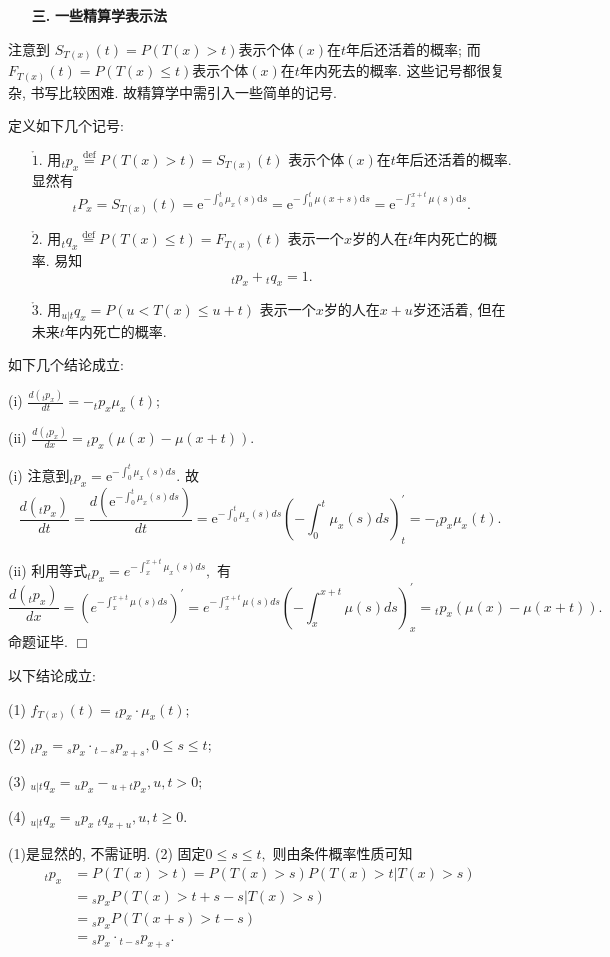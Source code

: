 \documentclass[a4paper,10pt]{ctexbook}
\newcommand{\hei}{\CJKfamily{hei}}      %
\def\qed{\hfill$\Box$\medskip}
\begin{document}
\begin{itemize}
    \item[{\bf\hei 三.}]{\bf\hei 一些精算学表示法}
\end{itemize}
注意到 $ S_{T(x)}(t)=P(T(x)>t)$表示个体$ (x)$在$t$年后还活着的概率; 而$F_{T(x)}(t)=P(T(x)\le t)$表示个体$(x)$在$t$年内死去的概率. 这些记号都很复杂, 书写比较困难. 故精算学中需引入一些简单的记号.


定义如下几个记号:
\begin{enumerate}
    \item[$\mathring 1.$] 用$_tp_{x}\stackrel{\text{def}}{=}P(T(x)>t)=S_{T(x)}(t)$
        表示个体$(x)$在$t$年后还活着的概率. 显然有
        $$ {}_tP_x=S_{T(x)}(t)=\mathrm{e}^{-\int_{0}^{t}\mu_x(s)\mathrm{d}s}=\mathrm{e}^{-\int_{0}^{t}\mu(x+s)\mathrm{d}s}=\mathrm{e}^{-\int_{x}^{x+t}\mu(s)\mathrm{d}s}.$$
    \item[$\mathring 2.$] 用$_tq_{x}\stackrel{\text{def}}{=}P(T(x)\leq t)=F_{T(x)}(t)$
        表示一个$x$岁的人在$t$年内死亡的概率. 易知
        $$_tp_{x}+{}_tq_{x}=1.$$
    \item[$\mathring 3.$] 用$ _{u|t}q_x=P(u<T(x)\leq u+t)$
        表示一个$x$岁的人在$x+u$岁还活着, 但在未来$t$年内死亡的概率.
\end{enumerate}
\begin{proposition}如下几个结论成立:

    (i) $\frac{d(_tp_x)}{dt}=-_tp_x\mu_x(t);$

    (ii) $\frac{d(_tp_x)}{dx}= {}_tp_x(\mu(x)-\mu(x+t)).$


\end{proposition}

\proof (i) 注意到${}_tp_x=\mathrm{e}^{-\int_{0}^{t}\mu_x(s)ds}.$ 故
$$\frac{d(_tp_x)}{dt}=\frac{d(\mathrm{e}^{-\int_{0}^{t}\mu_x(s)ds})}{dt}=\mathrm{e}^{-\int_{0}^{t}\mu_x(s)ds}({-\int_{0}^{t}\mu_x(s)ds})^{\prime}_t=-_tp_x\mu_x(t).$$

(ii) 利用等式${}_tp_x=e^{-\int_{x}^{x+t}\mu_x(s)ds},$ 有
$$\frac{d(_tp_x)}{dx}=(e^{-\int_{x}^{x+t}\mu(s)ds})^{\prime}=e^{-\int_{x}^{x+t}\mu(s)ds}({-\int_{x}^{x+t}\mu(s)ds})^{\prime}_x= {}_tp_x(\mu(x)-\mu(x+t)).$$
命题证毕.
\qed

\begin{proposition}以下结论成立:

    (1) $f_{T(x)}(t)={}_tp_x\cdot \mu_x(t);$

    (2) $_tp_x={}_sp_x\cdot{}_{t-s}p_{x+s},0\leq s\leq t;$

    (3) ${}_{u|t}q_x={}_up_x-{}_{u+t}p_x, u,t>0;$

    (4) ${}_{u|t}q_x={}_up_x~{}_{t}q_{x+u},u,t\ge0.$
\end{proposition}
\proof (1)是显然的, 不需证明. (2)
固定$0\le s\le t,$ 则由条件概率性质可知
\begin{align*}
    {}_tp_x & =P(T(x)>t)=P(T(x)>s)P(T(x)>t|T(x)>s) \\
            & ={}_sp_xP(T(x)>t+s-s|T(x)>s)         \\
            & ={}_sp_xP(T(x+s)>t-s)                \\
            & ={}_sp_x\cdot{}_{t-s}p_{x+s}.\end{align*}
\end{document}
